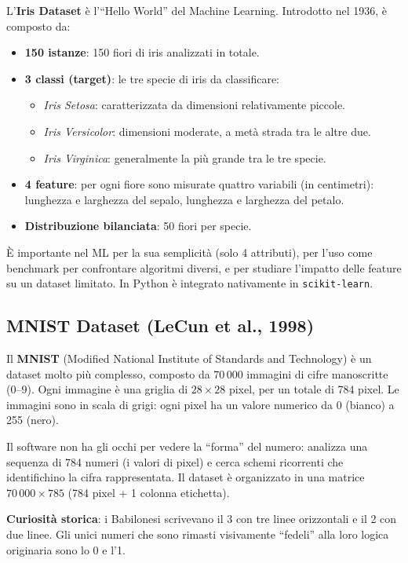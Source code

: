 L'\textbf{Iris Dataset} è l'``Hello World'' del Machine Learning. Introdotto nel 1936, è composto da:
\begin{itemize}
    \item \textbf{150 istanze}: 150 fiori di iris analizzati in totale.
    \item \textbf{3 classi (target)}: le tre specie di iris da classificare:
    \begin{itemize}
        \item \emph{Iris Setosa}: caratterizzata da dimensioni relativamente piccole.
        \item \emph{Iris Versicolor}: dimensioni moderate, a metà strada tra le altre due.
        \item \emph{Iris Virginica}: generalmente la più grande tra le tre specie.
    \end{itemize}
    \item \textbf{4 feature}: per ogni fiore sono misurate quattro variabili (in centimetri): lunghezza e larghezza del sepalo, lunghezza e larghezza del petalo.
    \item \textbf{Distribuzione bilanciata}: 50 fiori per specie.
\end{itemize}

È importante nel ML per la sua semplicità (solo 4 attributi), per l'uso come benchmark per confrontare algoritmi diversi, e per studiare l'impatto delle feature su un dataset limitato. In Python è integrato nativamente in \texttt{scikit-learn}.

\subsection{MNIST Dataset (LeCun et al., 1998)}
Il \textbf{MNIST} (Modified National Institute of Standards and Technology) è un dataset molto più complesso, composto da 70\,000 immagini di cifre manoscritte (0--9). Ogni immagine è una griglia di $28 \times 28$ pixel, per un totale di 784 pixel. Le immagini sono in scala di grigi: ogni pixel ha un valore numerico da 0 (bianco) a 255 (nero).

\begin{notebox}
Il software non ha gli occhi per vedere la ``forma'' del numero: analizza una sequenza di 784 numeri (i valori di pixel) e cerca schemi ricorrenti che identifichino la cifra rappresentata. Il dataset è organizzato in una matrice $70\,000 \times 785$ (784 pixel + 1 colonna etichetta).

\textbf{Curiosità storica}: i Babilonesi scrivevano il 3 con tre linee orizzontali e il 2 con due linee. Gli unici numeri che sono rimasti visivamente ``fedeli'' alla loro logica originaria sono lo 0 e l'1.
\end{notebox}

